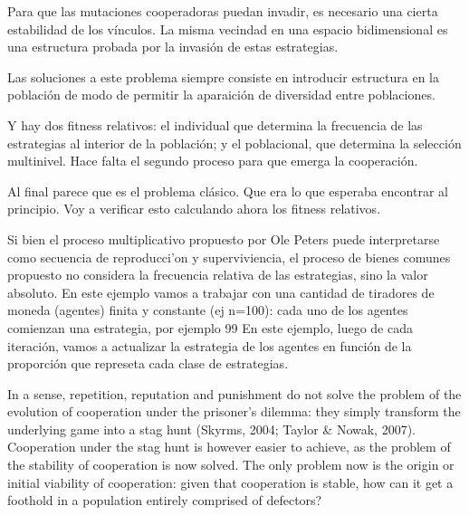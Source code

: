 \documentclass[a4paper,10pt]{article}
\begin{document}

Para que las mutaciones cooperadoras puedan invadir, es necesario una cierta estabilidad de los vínculos.
La misma vecindad en una espacio bidimensional es una estructura probada por la invasión de estas estrategias.



Las soluciones a este problema siempre consiste en introducir estructura en la población de modo de permitir la aparaición de diversidad entre poblaciones.

% 

Y hay dos fitness relativos: el individual que determina la frecuencia de las estrategias al interior de la población; y el poblacional, que determina la selección multinivel. Hace falta el segundo proceso para que emerga la cooperación.


Al final parece que es el problema clásico. Que era lo que esperaba encontrar al principio. Voy a verificar esto calculando ahora los fitness relativos.


 Si bien el proceso multiplicativo propuesto por Ole Peters puede interpretarse como secuencia de reproducci'on y superviviencia, el proceso de bienes comunes propuesto no considera la frecuencia relativa de las estrategias, sino la valor absoluto.
 En este ejemplo vamos a trabajar con una cantidad de tiradores de moneda (agentes) finita y constante (ej n=100): cada uno de los agentes comienzan una estrategia, por ejemplo 99%
 En este ejemplo, luego de cada iteración, vamos a actualizar la estrategia de los agentes en función de la proporción que represeta cada clase de estrategias.






In a sense, repetition, reputation and punishment do not solve the problem of the evolution of cooperation under the prisoner’s dilemma: they simply transform the underlying game into a stag hunt (Skyrms, 2004; Taylor & Nowak, 2007). Cooperation under the stag hunt is however easier to achieve, as the problem of the stability of cooperation is now solved. The only problem now is the origin or initial viability of cooperation: given that cooperation is stable, how can it get a foothold in a population entirely comprised of defectors?
 
 

{\footnotesize


}
\end{document}
